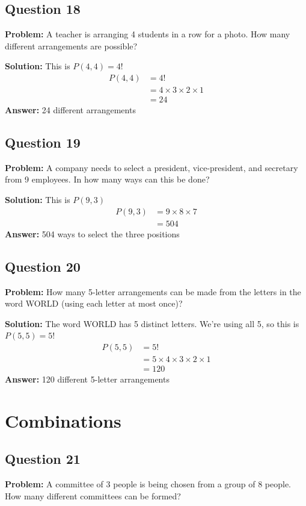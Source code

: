 \documentclass[12pt]{article}
\begin{document}
\subsection*{Question 18}
\textbf{Problem:} A teacher is arranging 4 students in a row for a photo. How many different arrangements are possible?

\textbf{Solution:} This is $P(4,4) = 4!$
\begin{align*}
P(4,4) &= 4! \\
&= 4 \times 3 \times 2 \times 1 \\
&= 24
\end{align*}
\textbf{Answer:} 24 different arrangements

\subsection*{Question 19}
\textbf{Problem:} A company needs to select a president, vice-president, and secretary from 9 employees. In how many ways can this be done?

\textbf{Solution:} This is $P(9,3)$
\begin{align*}
P(9,3) &= 9 \times 8 \times 7 \\
&= 504
\end{align*}
\textbf{Answer:} 504 ways to select the three positions

\subsection*{Question 20}
\textbf{Problem:} How many 5-letter arrangements can be made from the letters in the word WORLD (using each letter at most once)?

\textbf{Solution:} The word WORLD has 5 distinct letters. We're using all 5, so this is $P(5,5) = 5!$
\begin{align*}
P(5,5) &= 5! \\
&= 5 \times 4 \times 3 \times 2 \times 1 \\
&= 120
\end{align*}
\textbf{Answer:} 120 different 5-letter arrangements

\section{Combinations}

\subsection*{Question 21}
\textbf{Problem:} A committee of 3 people is being chosen from a group of 8 people. How many different committees can be formed?
\end{document}
